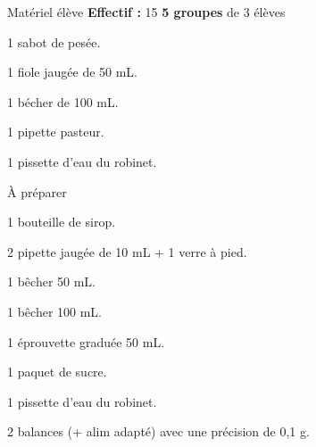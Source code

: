 
\begin{boiteMateriel}{Matériel élève}
  \textbf{Effectif :} 15
  \qq{}\qq{}
  \flecheLongue \textbf{5 groupes} de 3 élèves

  \begin{protocole}
    \item 1 sabot de pesée.
    \item 1 fiole jaugée de 50 mL.
    \item 1 bécher de 100 mL.
    \item 1 pipette pasteur.
    \item 1 pissette d’eau du robinet.
  \end{protocole}
\end{boiteMateriel}


\begin{boiteMateriel}{À préparer}
  \begin{protocole}
    \item 1 bouteille de sirop.
    \item 2 pipette jaugée de 10 mL + 1 verre à pied.
    \item 1 bêcher 50 mL.
    \item 1 bêcher 100 mL.
    \item 1 éprouvette graduée 50 mL.
    \item 1 paquet de sucre.
    \item 1 pissette d’eau du robinet.
    \item 2 balances (+ alim adapté) avec une précision de 0,1 g.
  \end{protocole}
\end{boiteMateriel}